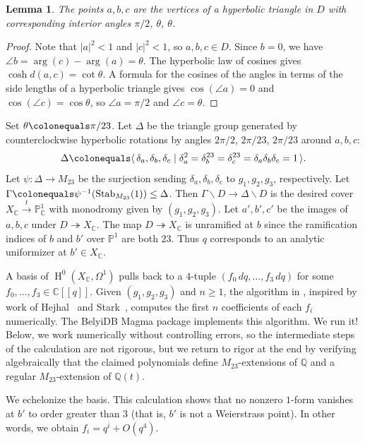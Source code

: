 \documentclass[12pt,reqno]{amsart}
\newcommand{\C}{\mathbb{C}}
\newcommand{\PP}{\mathbb{P}}
\newcommand{\Q}{\mathbb{Q}}
\DeclareMathOperator{\HH}{H}
\DeclareMathOperator{\Stab}{Stab}
\newcommand{\surjects}{\twoheadrightarrow}
\newtheorem{lemma}[theorem]{Lemma}
\theoremstyle{definition}
\theoremstyle{remark}
\begin{document}
\begin{lemma}
  The points $a,b,c$ are the vertices of a hyperbolic triangle in $D$ with corresponding interior angles $\pi/2$, $\theta$, $\theta$. 
\end{lemma}

\begin{proof}
Note that $|a|^2 < 1$ and $|c|^2 < 1$, so $a,b,c \in D$.
Since $b=0$, we have $\angle b = \arg(c) - \arg(a) = \theta$.
The hyperbolic law of cosines gives $\cosh d(a,c) = \cot \theta$.
A formula for the cosines of the angles in terms of the side lengths of a hyperbolic triangle gives $\cos(\angle a) = 0$ and $\cos(\angle c) = \cos \theta$, so $\angle a = \pi/2$ and $\angle c = \theta$.
\end{proof}

Set $\theta \colonequals \pi/23$.
Let $\Delta$ be the triangle group generated by counterclockwise hyperbolic rotations by angles $2\pi/2$, $2\pi/23$, $2\pi/23$ around $a,b,c$: 
\[
\Delta \colonequals \langle \, \delta_a,\delta_b,\delta_c \mid \delta_a^2=\delta_b^{23}=\delta_c^{23}=\delta_a\delta_b\delta_c=1 \, \rangle.   
\]
Let $\psi \colon \Delta \to M_{23}$ be the surjection sending $\delta_a,\delta_b,\delta_c$ to $g_1,g_2,g_3$, respectively.
Let $\Gamma \colonequals \psi^{-1}(\Stab_{M_{23}}(1)) \le \Delta$.
Then $\Gamma \backslash D \to \Delta \backslash D$ is the desired cover 
$X_\C \stackrel{t}\to \PP^1_\C$ with monodromy given by $(g_1,g_2,g_3)$.
Let $a',b',c'$ be the images of $a,b,c$ under $D \surjects X_\C$.
The map $D \surjects X_\C$ is unramified at $b$ since the ramification indices of $b$ and $b'$ over $\PP^1$ are both $23$.
Thus $q$ corresponds to an analytic uniformizer at $b' \in X_\C$.

A basis of $\HH^0(X_\C,\Omega^1)$ pulls back to a $4$-tuple $(f_0 \, dq,\ldots,f_3 \, dq)$ for some $f_0,\ldots,f_3 \in \C[[q]]$.
Given $(g_1,g_2,g_3)$ and $n \ge 1$, the algorithm in \cite{Klug-Musty-Schiavone-Voight2014}, inspired by work of Hejhal~\cite{Hejhal1999} and Stark~\cite{Stark1984}, 
computes the first $n$ coefficients of each $f_i$ numerically.
The BelyiDB Magma package \cite{Musty-Schiavone-Sijsling-Voight2019} implements this algorithm.
We run it!
Below, we work numerically without controlling errors, so the intermediate steps of the calculation are not rigorous, but we return to rigor at the end by verifying algebraically that the claimed polynomials define $M_{23}$-extensions of $\Q$ and a regular $M_{23}$-extension of $\Q(t)$. 

We echelonize the basis.
This calculation shows that no nonzero $1$-form vanishes at $b'$ to order greater than $3$
(that is, $b'$ is not a Weierstrass point).
In other words, we obtain $f_i = q^i + O(q^4)$. 
\end{document}
